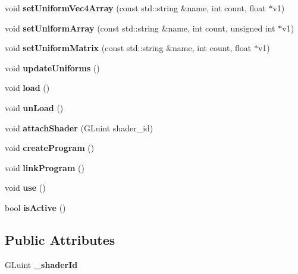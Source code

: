 \begin{DoxyCompactItemize}
\item 
void {\bfseries set\-Uniform\-Vec4\-Array} (const std\-::string \&name, int count, float $\ast$v1)\label{classsfs__visualizer_1_1Shader_a66d2819b9cc558dbcedf1cd45c0e4cbd}

\item 
void {\bfseries set\-Uniform\-Array} (const std\-::string \&name, int count, unsigned int $\ast$v1)\label{classsfs__visualizer_1_1Shader_a4144a18c538d3bfc348d358a3a7e949a}

\item 
void {\bfseries set\-Uniform\-Matrix} (const std\-::string \&name, int count, float $\ast$v1)\label{classsfs__visualizer_1_1Shader_a4ac702af346f3cf8e14998bb4f59e326}

\item 
void {\bfseries update\-Uniforms} ()\label{classsfs__visualizer_1_1Shader_a605b87e078f7eaf0cf9777f7f6319311}

\item 
void {\bfseries load} ()\label{classsfs__visualizer_1_1Shader_a4222b925de192c794cdef621b13a5914}

\item 
void {\bfseries un\-Load} ()\label{classsfs__visualizer_1_1Shader_aa6e66aded6c712272998a146372850b0}

\item 
void {\bfseries attach\-Shader} (G\-Luint shader\-\_\-id)\label{classsfs__visualizer_1_1Shader_a0d5dc86ead4edde7010b76cb7df2ec46}

\item 
void {\bfseries create\-Program} ()\label{classsfs__visualizer_1_1Shader_ab3ceeba9cf9f760fc3eaa97e81578103}

\item 
void {\bfseries link\-Program} ()\label{classsfs__visualizer_1_1Shader_a75c069ae57bc198b229bd56b18e9b459}

\item 
void {\bfseries use} ()\label{classsfs__visualizer_1_1Shader_a870fa9f13d69e558815d6fd351a469dc}

\item 
bool {\bfseries is\-Active} ()\label{classsfs__visualizer_1_1Shader_a89103f6e4224e366307b7a89898f2a0f}

\end{DoxyCompactItemize}
\subsection*{Public Attributes}
\begin{DoxyCompactItemize}
\item 
G\-Luint {\bfseries \-\_\-shader\-Id}\label{classsfs__visualizer_1_1Shader_aed41f9ecc4dcc30ee1d307d33b48cd21}

\end{DoxyCompactItemize}
